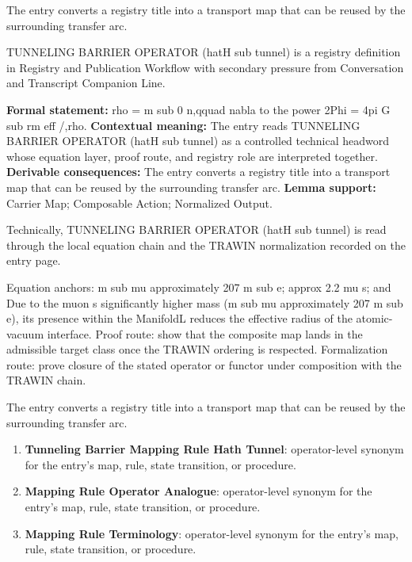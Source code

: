 The entry converts a registry title into a transport map that can be reused by the surrounding transfer arc.
\clearpage


\begingroup\small
{}
TUNNELING BARRIER OPERATOR (hatH sub tunnel) is a registry definition in Registry and Publication Workflow with secondary pressure from Conversation and Transcript Companion Line.

\begingroup\footnotesize\setlength{\emergencystretch}{3em}\sloppy
\textbf{Formal statement:} rho = m sub 0 n,qquad nabla to the power 2Phi = 4pi G sub rm eff /,rho. \textbf{Contextual meaning:} The entry reads TUNNELING BARRIER OPERATOR (hatH sub tunnel) as a controlled technical headword whose equation layer, proof route, and registry role are interpreted together. \textbf{Derivable consequences:} The entry converts a registry title into a transport map that can be reused by the surrounding transfer arc. \textbf{Lemma support:} Carrier Map; Composable Action; Normalized Output.\par
\endgroup

Technically, TUNNELING BARRIER OPERATOR (hatH sub tunnel) is read through the local equation chain and the TRAWIN normalization recorded on the entry page.

Equation anchors: m sub mu approximately 207 m sub e; approx 2.2 mu s; and Due to the muon s significantly higher mass (m sub mu approximately 207 m sub e), its presence within the ManifoldL reduces the effective radius of the atomic-vacuum interface. Proof route: show that the composite map lands in the admissible target class once the TRAWIN ordering is respected. Formalization route: prove closure of the stated operator or functor under composition with the TRAWIN chain.

The entry converts a registry title into a transport map that can be reused by the surrounding transfer arc.
\endgroup

\begin{enumerate}[leftmargin=1.6em,itemsep=6pt,topsep=4pt]
\item \textbf{Tunneling Barrier Mapping Rule Hath Tunnel}: operator-level synonym for the entry's map, rule, state transition, or procedure.
\item \textbf{Mapping Rule Operator Analogue}: operator-level synonym for the entry's map, rule, state transition, or procedure.
\item \textbf{Mapping Rule Terminology}: operator-level synonym for the entry's map, rule, state transition, or procedure.
\end{enumerate}

